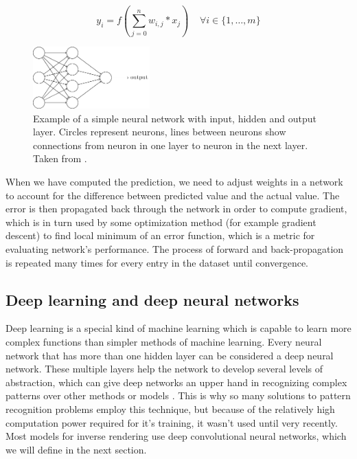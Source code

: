     \begin{equation} \label{eq:feed-forward}
        y_i = f(\sum_{j=0}^{n} w_{i, j} * x_j) \; \; \; \; \forall i \in \{1, \dots, m \}
    \end{equation}{}
    \begin{figure}
        \centerline{\includegraphics[width=0.4\textwidth]{praca/images/nn.png}}
        \caption[Example of a simple neural network]{Example of a simple neural network with input, hidden and output layer. Circles represent neurons, lines between neurons show connections from neuron in one layer to neuron in the next layer. Taken from \cite{nielsenneural}.}
        \label{img:simple_nn}
    \end{figure}
    \newline
    When we have computed the prediction, we need to adjust weights in a network to account for the difference between predicted value and the actual value. The error is then propagated back through the network in order to compute gradient, which is in turn used by some optimization method (for example gradient descent) to find local minimum of an error function, which is a metric for evaluating network's performance. The process of forward and back-propagation is repeated many times for every entry in the dataset until convergence.
    \subsection{Deep learning and deep neural networks} \label{deep-learning}
    Deep learning is a special kind of machine learning which is capable to learn more complex functions than simpler methods of machine learning. Every neural network that has more than one hidden layer can be considered a deep neural network. These multiple layers help the network to develop several levels of abstraction, which can give deep networks an upper hand in recognizing complex patterns over other methods or models \cite{deep-learning}. This is why so many solutions to pattern recognition problems employ this technique, but because of the relatively high computation power required for it's training, it wasn't used until very recently. Most models for inverse rendering use deep convolutional neural networks, which we will define in the next section.
